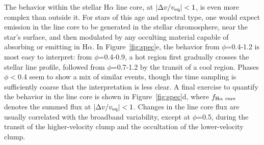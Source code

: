 \documentclass{nature3}
\begin{document}
The behavior within the stellar H$\alpha$ line core, at $|\Delta v /
v_{\rm eq}|<1$, is even more complex than outside it.  For stars of
this age and spectral type, one would expect emission in the line core
to be generated in the stellar chromosphere, near the star's surface,
and then modulated by any occulting material capable of absorbing or
emitting in H$\alpha$.  In Figure~\ref{fig:spec}e, the behavior from
$\phi$=0.4-1.2 is most easy to interpret: from $\phi$=0.4-0.9, a hot
region first gradually crosses the stellar line profile, followed from
$\phi$=0.7-1.2 by the transit of a cool region.  Phases $\phi$$<$0.4
seem to show a mix of similar events, though the time sampling is
sufficiently coarse that the interpretation is less clear.  A final
exercise to quantify the behavior in the line core is shown in
Figure~\ref{fig:spec}d, where $f_{\rm H\alpha\ core}$ denotes the
summed flux at $|\Delta v / v_{\rm eq}|<1$.  Changes in the line core
flux are usually correlated with the broadband variability, except at
$\phi$=0.5, during the transit of the higher-velocity clump and the
occultation of the lower-velocity clump.
\end{document}
